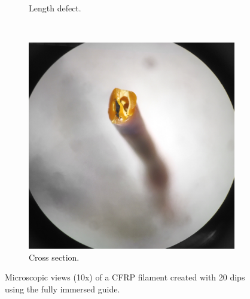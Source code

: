 \begin{figure}[h!]
\begin{subfigure}[b]{0.3\textwidth}
                \caption{Length defect.}
                \label{fig:20-og-defect}
        \end{subfigure}
        ~ %
        \begin{subfigure}[b]{0.3\textwidth}
                \includegraphics[width=\textwidth]{./figures/20-ng-end}
                \caption{Cross section.}
                \label{fig:20-og-end}
        \end{subfigure}
        \caption{Microscopic views (10x) of a CFRP filament created with 20 dips using the fully immersed guide.}\label{fig:20-ng}
\end{figure}


